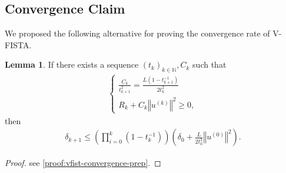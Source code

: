 \documentclass[]{article}
\theoremstyle{definition}
\newtheorem{lemma}{Lemma}[subsection]  %
\numberwithin{equation}{subsection}
\begin{document}
    \subsection{Convergence Claim}
        We proposed the following alternative for proving the convergence rate of V-FISTA. 
        \begin{lemma}\label{lemma:convergence-prep}
            If there exists a sequence $(t_k)_{k\in \mathbb N}, C_k$ such that 
            \begin{align}
                \begin{cases}
                    \frac{C_k}{t_{k + 1}^2} = \frac{L(1 - t^{-1}_{k + 1})}{2t_{k}^2}
                    \\
                    R_k + C_k\left\Vert
                        u^{(k)}
                    \right\Vert^2 \ge 0, 
                \end{cases}
            \end{align}
            then 
            \begin{align*}
                \delta_{k + 1}
                \le 
                \left(
                    \prod_{i = 0}^{k} (1 - t_k^{-1})
                \right)\left(
                    \delta_0 + \frac{L}{2t_0^2}\left\Vert
                        u^{(0)}
                    \right\Vert^2
                \right). 
            \end{align*}
        \end{lemma}
        \begin{proof}
            see \hyperref[proof:vfist-convergence-prep]{\ref*{proof:vfist-convergence-prep}}.    
        \end{proof}
        
\end{document}
